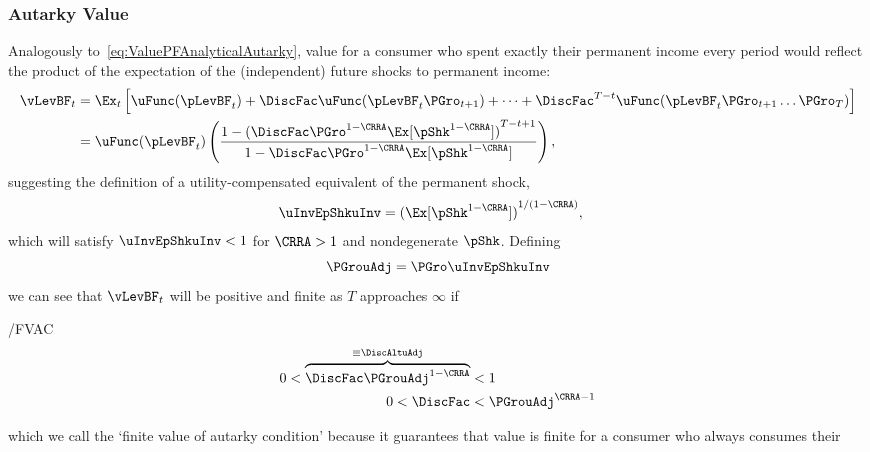 \documentclass[BufferStockTheory]{subfiles}
\begin{document}
\subsubsection{Autarky Value}
Analogously to~\eqref{eq:ValuePFAnalyticalAutarky}, value for a consumer who spent exactly their permanent income every period would reflect the product of the expectation of the (independent) future shocks to permanent income:\hypertarget{uInvEpShkuInv}{}
\begin{align*}
  \vLevBF_{t}  & = \Ex_{t}\left[\uFunc(\pLevBF_{t}) + \DiscFac \uFunc(\pLevBF_{t}\PGro_{t+1}) + \cdots + \DiscFac^{T-t}\uFunc(\pLevBF_{t}\PGro_{t+1}\ldots\PGro_{T})\right] \\
               & = \uFunc(\pLevBF_{t})\left(\frac{1-{(\DiscFac \PGro^{1-\CRRA}\Ex[\pShk^{1-\CRRA}])}^{T-t+1}}{1-\DiscFac \PGro^{1-\CRRA} \Ex[\pShk^{1-\CRRA}]}\right),
\end{align*}
suggesting the definition of a utility-compensated equivalent of the permanent shock,\hypertarget{PermGrouAdj}{}
\begin{align}
  \uInvEpShkuInv  & = {(\Ex[\pShk^{1-\CRRA}])}^{1/(1-\CRRA)} \label{eq:uInvEpShkuInv},
\end{align}
which will satisfy $\uInvEpShkuInv < 1$ for $\CRRA>1$ and nondegenerate $\pShk$.%
\hypertarget{DiscAltuAdj}{} Defining
\begin{equation}
  \label{eq:PGrouAdj}
  \PGrouAdj = \PGro \uInvEpShkuInv
\end{equation}
we can see that $\vLevBF_{t}$ will be positive and finite as $T$ approaches $\infty$ if\hypertarget{FVAC}{}
\begin{verbatimwrite}{\EqDir/FVAC}
  \begin{align}
    0 < \overbrace{\DiscFac \PGrouAdj^{1-\CRRA} }^{\equiv \DiscAltuAdj}  & < 1 \notag
    \\ 0 < \DiscFac  & < \PGrouAdj^{\CRRA-1} \label{eq:FVAC}
  \end{align}
\end{verbatimwrite}
{}
which we call the `finite value of autarky condition' because it guarantees that value is finite for a consumer who always consumes their
\end{document}
